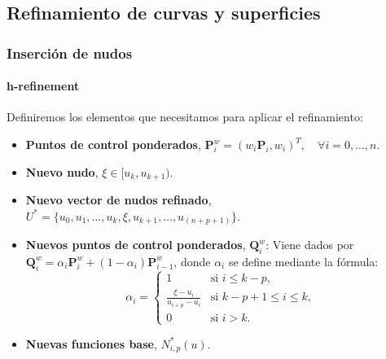 \documentclass[compress]{beamer}
\begin{document}
\subsection{Refinamiento de curvas y superficies}
\begin{frame}
	\frametitle{Inserción de nudos}
	\framesubtitle{h-refinement}
	\scriptsize
	\begin{definition}
        Definiremos los elementos que necesitamos para aplicar el refinamiento:
        \begin{itemize}
			\item \textbf{Puntos de control ponderados}, $\mathbf{P}_i^w = (w_i\mathbf{P}_i, w_i)^T, \quad \forall i = 0, \dots , n$.
			\item \textbf{Nuevo nudo}, $\xi \in [u_k, u_{k+1})$.
			\item \textbf{Nuevo vector de nudos refinado}, $U^*=\{u_0,u_1, \dots , u_k, \xi, u_{k+1}, \dots, u_{(n+p+1)}\}$.
			\item \textbf{Nuevos puntos de control ponderados}, $\mathbf{Q}_i^w$: Viene dados por $\mathbf{Q}_{i}^{w} = \alpha_i \mathbf{P}_{i}^{w} + (1 - \alpha_i) \mathbf{P}_{i-1}^{w}$, donde $\alpha_i$ se define mediante la fórmula:
					$$\alpha_i = \begin{cases} 1 & \text{si } i \le k-p, \\ \frac{\xi - u_i}{u_{i+p} - u_i} & \text{si } k-p+1 \le i \le k, \\ 0 & \text{si } i > k. \end{cases}$$
			\item \textbf{Nuevas funciones base}, $N_{i,p}^*(u)$.
		\end{itemize}
	\end{definition}
\end{frame}
\end{document}
